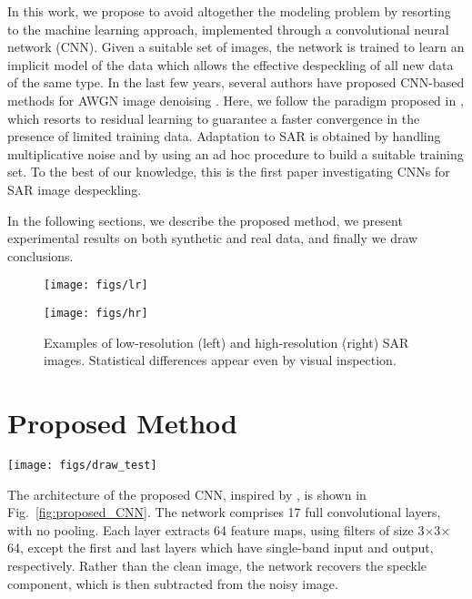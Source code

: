 \documentclass{article}
\begin{document}
In this work, we propose to avoid altogether the modeling problem by resorting to the machine learning approach, implemented through a convolutional neural network (CNN).
Given a suitable set of images,
the network is trained to learn an implicit model of the data which allows the effective despeckling of all new data of the same type.
In the last few years, several authors have proposed CNN-based methods for AWGN image denoising
\cite{Jain2009, Burger2012}.
Here, we follow the paradigm proposed in \cite{Zhang2016},
which resorts to residual learning to guarantee a faster convergence in the presence of limited training data.
Adaptation to SAR is obtained by handling multiplicative noise and by using an ad hoc procedure to build a suitable training set.
To the best of our knowledge, this is the first paper investigating CNNs for SAR image despeckling.

In the following sections, we describe the proposed method, we present experimental results on both synthetic and real data, and finally we draw conclusions.

\begin{figure}[t!]
	\begin{minipage}[b]{0.48\linewidth} \centerline{\texttt{[image: figs/lr]}} \end{minipage} \hfill
	\begin{minipage}[b]{0.48\linewidth} \centerline{\texttt{[image: figs/hr]}}	\end{minipage}
	\caption{Examples of low-resolution (left) and high-resolution (right) SAR images. Statistical differences appear even by visual inspection.}
	\label{fig:res}
\end{figure}


\section{Proposed Method}

\begin{figure*}[!t]
	\centerline{\texttt{[image: figs/draw\_test]}}
	\caption{Proposed CNN architecture for SAR image despeckling.}
	\label{fig:proposed_CNN}
\end{figure*}

The architecture of the proposed CNN, inspired by \cite{Zhang2016}, is shown in Fig.~\ref{fig:proposed_CNN}. The network comprises 17 full convolutional layers, with no pooling.
Each layer extracts 64 feature maps, using filters of size 3$\times$3$\times$64, except the first and last layers which have single-band input and output, respectively. Rather than the clean image, the network recovers the speckle component, which is then subtracted from the noisy image.
\end{document}
